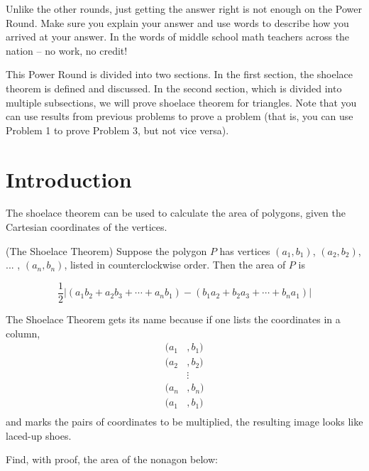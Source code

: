 \documentclass[11pt]{article}
\begin{document}
Unlike the other rounds, just getting the answer right is not enough on the Power Round. Make sure you explain your answer and use words
to describe how you arrived at your answer. In the words of middle school math teachers across the nation -- no work, no credit!

This Power Round is divided into two sections. In the first section, the shoelace theorem is defined and discussed.
In the second section, which is divided into multiple subsections, we will prove shoelace theorem for triangles. Note that you can use results from previous problems to prove a problem (that is, you can use Problem 1 to prove Problem 3, but not vice versa). 

\section{Introduction}

The shoelace theorem can be used to calculate the area of polygons, given the Cartesian coordinates of the vertices. 

\begin{theorem} (The Shoelace Theorem) Suppose the polygon $P$ has vertices $(a_1, b_1)$, $(a_2, b_2)$, ... , $(a_n, b_n)$, listed in counterclockwise order. Then the area of $P$ is

\[\dfrac{1}{2} |(a_1b_2 + a_2b_3 + \cdots + a_nb_1) - (b_1a_2 + b_2a_3 + \cdots + b_na_1)|\]
\end{theorem}

The Shoelace Theorem gets its name because if one lists the coordinates in a column, 
\begin{align*} 
(a_1 &, b_1) \\ 
(a_2 &, b_2) \\ 
& \vdots \\ 
(a_n &, b_n) \\ 
(a_1 &, b_1) \\ 
\end{align*} 
and marks the pairs of coordinates to be multiplied, the resulting image looks like laced-up shoes.


\begin{problem}
Find, with proof, the area of the nonagon below:
\begin{center}
\end{center}
\end{problem}
\end{document}
